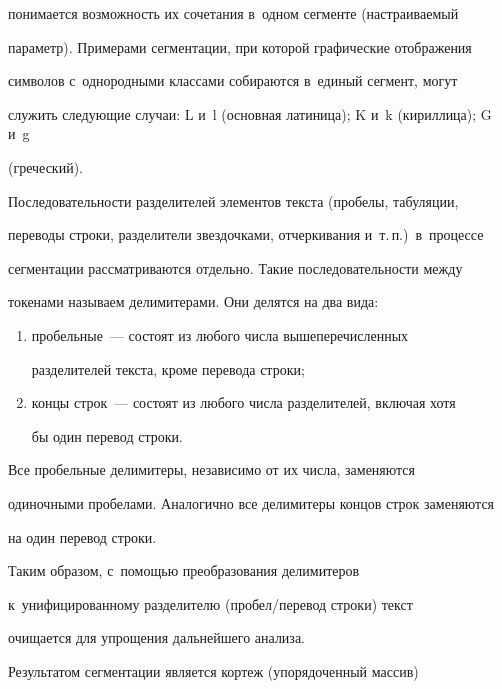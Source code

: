 понимается возможность их сочетания в~одном сегменте (настраиваемый 


параметр). Примерами сегментации, при которой графические отображения 


символов с~однородными классами собираются в~единый сегмент, могут 


служить следующие случаи: L и~l (основная латиница); K и~k (кириллица); G и~g 


(греческий).


  


  Последовательности разделителей элементов текста (пробелы, табуляции, 


переводы строки, разделители звездочками, отчеркивания и~т.\,п.)\ в~процессе 


сегментации рассматриваются отдельно. Такие последовательности между 


токенами называем делимитерами. Они делятся на два вида:


  \begin{enumerate}[(1)]


\item пробельные~--- состоят из любого числа вышеперечисленных 


разделителей текста, кроме перевода строки;


\item концы строк~--- состоят из любого числа разделителей, включая хотя 


бы один перевод строки.


\end{enumerate}





  Все пробельные делимитеры, независимо от их числа, заменяются 


одиночными пробелами. Аналогично все делимитеры концов строк заменяются 


на один перевод строки.


  


  Таким образом, с~помощью преобразования делимитеров 


к~унифицированному разделителю (про\-бел\!/\!пе\-ре\-вод строки) текст 


очищается для упрощения дальнейшего анализа.


  


  Результатом сегментации является кортеж (упорядоченный массив) 


